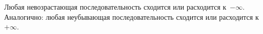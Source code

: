 
Любая невозрастающая последовательность сходится или расходится к~$-\infty$.
 Аналогично: любая неубывающая последовательность сходится или расходится к~$+\infty$.

